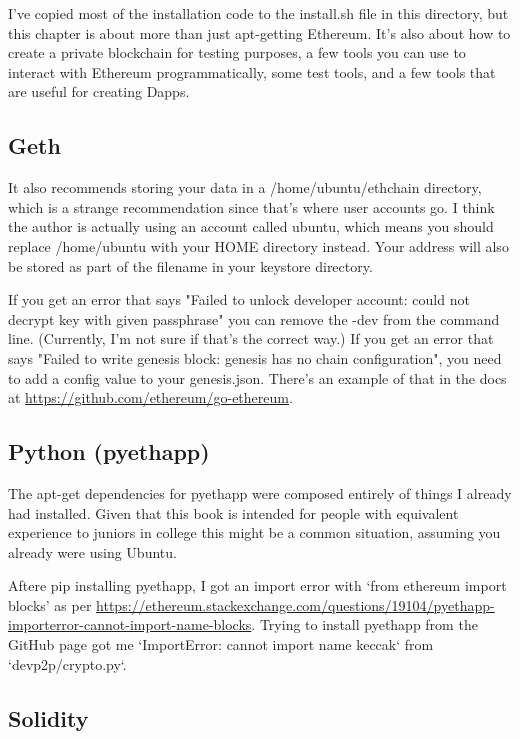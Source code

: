 \documentclass{article}
\begin{document}
I've copied most of the installation code to the install.sh file in this directory, but this chapter is about more than just apt-getting Ethereum. It's also about how to create a private blockchain for testing purposes, a few tools you can use to interact with Ethereum programmatically, some test tools, and a few tools that are useful for creating Dapps.

\subsection{Geth}
It also recommends storing your data in a /home/ubuntu/ethchain directory, which is a strange recommendation since that's where user accounts go. I think the author is actually using an account called ubuntu, which means you should replace /home/ubuntu with your HOME directory instead. Your address will also be stored as part of the filename in your keystore directory.

If you get an error that says "Failed to unlock developer account: could not decrypt key with given passphrase" you can remove the -dev from the command line.  (Currently, I'm not sure if that's the correct way.) If you get an error that says "Failed to write genesis block: genesis has no chain configuration", you need to add a config value to your genesis.json. There's an example of that
in the docs at \url{https://github.com/ethereum/go-ethereum}.


\subsection{Python (pyethapp)}
The apt-get dependencies for pyethapp were composed entirely of things I already had installed. Given that this book is intended
for people with equivalent experience to juniors in college this might be a common situation, assuming you already were using Ubuntu. %

Aftere pip installing pyethapp, I got an import error with `from ethereum import blocks' as per \url{https://ethereum.stackexchange.com/questions/19104/pyethapp-importerror-cannot-import-name-blocks}. Trying to install pyethapp from the GitHub page got me `ImportError: cannot import name keccak` from `devp2p/crypto.py`.


\subsection{Solidity}
\end{document}
